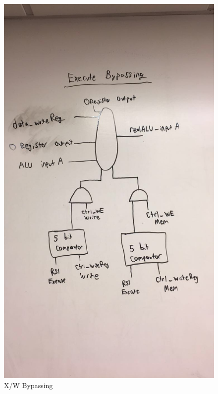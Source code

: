 \documentclass[letterpaper]{article} %
\begin{document}
  \begin{figure}[!htb]
        \includegraphics[scale=.45]{ExecuteBypassing.jpg}
        \caption{X/W Bypassing}
        \label{fig:2}
    \end{figure}
    
      \FloatBarrier
\end{document}
